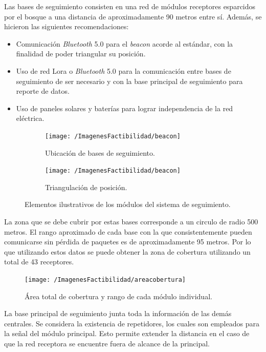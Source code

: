 Las bases de seguimiento consisten en una red de módulos receptores esparcidos por el bosque a una distancia de aproximadamente 90 metros entre sí.
Además, se hicieron las siguientes recomendaciones:
\begin{itemize}
	\item Comunicación \textit{Bluetooth} 5.0 para el \textit{beacon} acorde al estándar, con la finalidad de poder triangular su posición.
	\item Uso de red Lora o \textit{Bluetooth} 5.0 para la comunicación entre bases de seguimiento de ser necesario y con la base principal de seguimiento para reporte de datos.
	\item Uso de paneles solares y baterías para lograr independencia de la red eléctrica.
\end{itemize}
\begin{figure}[H]
\centering
	\begin{subfigure}{0.5\textwidth}
    	\centering
    	\texttt{[image: /ImagenesFactibilidad/beacon]}
  		\caption{Ubicación de bases de seguimiento.}
  		\label{fig:sfig1}
    \end{subfigure}\hfill
    \begin{subfigure}{0.5\textwidth}
    	\centering
    	\texttt{[image: /ImagenesFactibilidad/beacon]}
  		\caption{Triangulación de posición.}
  		\label{fig:sfig2}
    \end{subfigure}
	\caption{Elementos ilustrativos de los módulos del sistema de seguimiento.}
	\label{fig:componentes_beacon}
\end{figure}

La zona que se debe cubrir por estas bases corresponde a un circulo de radio 500 metros. El rango aproximado de cada base con la que consistentemente pueden comunicarse sin pérdida de paquetes es de aproximadamente 95 metros. Por lo que utilizando estos datos se puede obtener la zona de cobertura utilizando un total de 43 receptores.
\begin{figure}[H]
	\centering
    \texttt{[image: /ImagenesFactibilidad/areacobertura]}
	\caption{Área total de cobertura y rango de cada módulo individual.}
	\label{fig:Areatotal}
\end{figure}

La base principal de seguimiento junta toda la información de las demás centrales. Se considera la existencia de repetidores, los cuales son empleados para la señal del módulo principal. Esto permite extender la distancia en el caso de que la red receptora se encuentre fuera de alcance de la principal.

